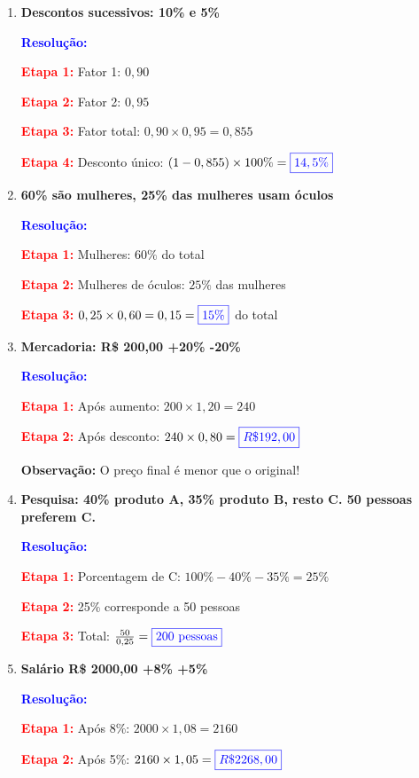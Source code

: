 \documentclass[11pt]{article}
\newcommand{\respostaNum}[1]{\textcolor{blue}{\boxed{#1}}}
\newcommand{\resolucao}{\textbf{\textcolor{blue}{Resolução:}}}
\begin{document}
\begin{multicols}{2}
\begin{enumerate}[leftmargin=*, start=15]
\item \textbf{Descontos sucessivos: 10\% e 5\%}

\resolucao

\textbf{\textcolor{red}{Etapa 1:}} Fator 1: $0,90$

\textbf{\textcolor{red}{Etapa 2:}} Fator 2: $0,95$

\textbf{\textcolor{red}{Etapa 3:}} Fator total: $0,90 \times 0,95 = 0,855$

\textbf{\textcolor{red}{Etapa 4:}} Desconto único: $(1 - 0,855) \times 100\% = \respostaNum{14,5\%}$

\item \textbf{60\% são mulheres, 25\% das mulheres usam óculos}

\resolucao

\textbf{\textcolor{red}{Etapa 1:}} Mulheres: $60\%$ do total

\textbf{\textcolor{red}{Etapa 2:}} Mulheres de óculos: $25\%$ das mulheres

\textbf{\textcolor{red}{Etapa 3:}} $0,25 \times 0,60 = 0,15 = \respostaNum{15\%}$ do total

\item \textbf{Mercadoria: R\$ 200,00 +20\% -20\%}

\resolucao

\textbf{\textcolor{red}{Etapa 1:}} Após aumento: $200 \times 1,20 = 240$

\textbf{\textcolor{red}{Etapa 2:}} Após desconto: $240 \times 0,80 = \respostaNum{R\$ 192,00}$

\textbf{Observação:} O preço final é menor que o original!

\item \textbf{Pesquisa: 40\% produto A, 35\% produto B, resto C. 50 pessoas preferem C.}

\resolucao

\textbf{\textcolor{red}{Etapa 1:}} Porcentagem de C: $100\% - 40\% - 35\% = 25\%$

\textbf{\textcolor{red}{Etapa 2:}} 25\% corresponde a 50 pessoas

\textbf{\textcolor{red}{Etapa 3:}} Total: $\frac{50}{0,25} = \respostaNum{200 \text{ pessoas}}$

\item \textbf{Salário R\$ 2000,00 +8\% +5\%}

\resolucao

\textbf{\textcolor{red}{Etapa 1:}} Após 8\%: $2000 \times 1,08 = 2160$

\textbf{\textcolor{red}{Etapa 2:}} Após 5\%: $2160 \times 1,05 = \respostaNum{R\$ 2268,00}$


\end{enumerate}
\end{multicols}
\end{document}
